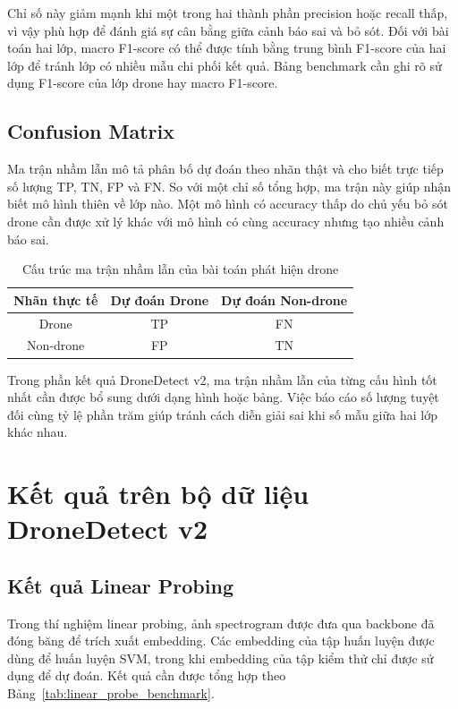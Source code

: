\documentclass[../DoAn.tex]{subfiles}
\begin{document}
Chỉ số này giảm mạnh khi một trong hai thành phần precision hoặc recall thấp, vì vậy phù hợp để đánh giá sự cân bằng giữa cảnh báo sai và bỏ sót. Đối với bài toán hai lớp, macro F1-score có thể được tính bằng trung bình F1-score của hai lớp để tránh lớp có nhiều mẫu chi phối kết quả. Bảng benchmark cần ghi rõ sử dụng F1-score của lớp drone hay macro F1-score.

\subsection{Confusion Matrix}

Ma trận nhầm lẫn mô tả phân bố dự đoán theo nhãn thật và cho biết trực tiếp số lượng TP, TN, FP và FN. So với một chỉ số tổng hợp, ma trận này giúp nhận biết mô hình thiên về lớp nào. Một mô hình có accuracy thấp do chủ yếu bỏ sót drone cần được xử lý khác với mô hình có cùng accuracy nhưng tạo nhiều cảnh báo sai.

\begin{table}[H]
    \centering
    \caption{Cấu trúc ma trận nhầm lẫn của bài toán phát hiện drone}
    \label{tab:confusion_matrix}
    \renewcommand{\arraystretch}{1.3}
    \begin{tabular}{|c|c|c|}
        \hline
        \textbf{Nhãn thực tế} & \textbf{Dự đoán Drone} & \textbf{Dự đoán Non-drone} \\ \hline
        Drone & TP & FN \\ \hline
        Non-drone & FP & TN \\ \hline
    \end{tabular}
\end{table}

Trong phần kết quả DroneDetect v2, ma trận nhầm lẫn của từng cấu hình tốt nhất cần được bổ sung dưới dạng hình hoặc bảng. Việc báo cáo số lượng tuyệt đối cùng tỷ lệ phần trăm giúp tránh cách diễn giải sai khi số mẫu giữa hai lớp khác nhau.

\section{Kết quả trên bộ dữ liệu DroneDetect v2}

\subsection{Kết quả Linear Probing}

Trong thí nghiệm linear probing, ảnh spectrogram được đưa qua backbone đã đóng băng để trích xuất embedding. Các embedding của tập huấn luyện được dùng để huấn luyện SVM, trong khi embedding của tập kiểm thử chỉ được sử dụng để dự đoán. Kết quả cần được tổng hợp theo Bảng~\ref{tab:linear_probe_benchmark}.
\end{document}

